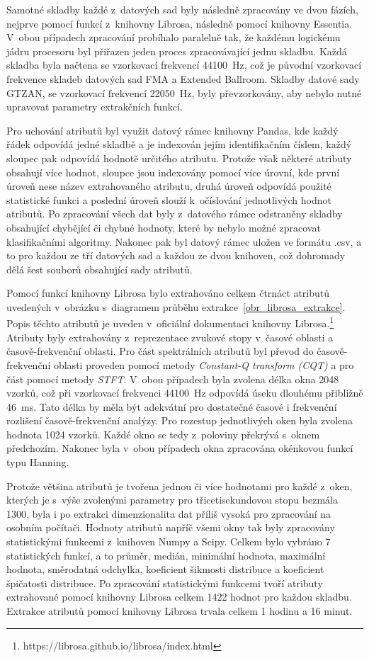 Samotné skladby každé z~datových sad byly následně zpracovány ve dvou fázích, nejprve pomocí funkcí z~knihovny Librosa, následně pomocí knihovny Essentia. V~obou případech zpracování probíhalo paralelně tak, že každému logickému jádru procesoru byl přiřazen jeden proces zpracovávající jednu skladbu. Každá skladba byla načtena se vzorkovací frekvencí 44100~Hz, což je původní vzorkovací frekvence skladeb datových sad FMA a Extended Ballroom. Skladby datové sady GTZAN, se vzorkovací frekvencí 22050~Hz, byly převzorkovány, aby nebylo nutné upravovat parametry extrakčních funkcí.

Pro uchování atributů byl využit datový rámec knihovny Pandas, kde každý řádek odpovídá jedné skladbě a je indexován jejím identifikačním číslem, každý sloupec pak odpovídá hodnotě určitého atributu. Protože však některé atributy obsahují více hodnot, sloupce jsou indexovány pomocí více úrovní, kde první úroveň nese název extrahovaného atributu, druhá úroveň odpovídá použité statistické funkci a poslední úroveň slouží k~očíslování jednotlivých hodnot atributů. Po zpracování všech dat byly z~datového rámce odstraněny skladby obsahující chybějící či chybné hodnoty, které by nebylo možné zpracovat klasifikačními algoritmy. Nakonec pak byl datový rámec uložen ve formátu .csv, a to pro každou ze tří datových sad a každou ze dvou knihoven, což dohromady dělá šest souborů obsahující sady atributů.

Pomocí funkcí knihovny Librosa bylo extrahováno celkem čtrnáct atributů uvedených v~obrázku s~diagramem průběhu extrakce~\ref{obr_librosa_extrakce}. Popis těchto atributů je uveden v~oficiální dokumentaci knihovny Librosa.\footnote{https://librosa.github.io/librosa/index.html} Atributy byly extrahovány z~reprezentace zvukové stopy v~časové oblasti a časově-frekvenční oblasti. Pro část spektrálních atributů byl převod do časově-frekvenční oblasti proveden pomocí metody \textit{Constant-Q transform (CQT)} a pro část pomocí metody \textit{STFT}. V~obou případech byla zvolena délka okna 2048 vzorků, což při vzorkovací frekvenci 44100~Hz odpovídá úseku dlouhému přibližně 46~ms. Tato délka by měla být adekvátní pro dostatečné časové i frekvenční rozlišení časově-frekvenční analýzy. Pro rozestup jednotlivých oken byla zvolena hodnota 1024 vzorků. Každé okno se tedy z~poloviny překrývá s~oknem předchozím. Nakonec byla v~obou případech okna zpracována okénkovou funkcí typu Hanning.

Protože většina atributů je tvořena jednou či více hodnotami pro každé z~oken, kterých je s~výše zvolenými parametry pro třicetisekundovou stopu bezmála 1300, byla i po extrakci dimenzionalita dat příliš vysoká pro zpracování na osobním počítači. Hodnoty atributů napříč všemi okny tak byly zpracovány statistickými funkcemi z~knihoven Numpy a Scipy. Celkem bylo vybráno 7 statistických funkcí, a to průměr, medián, minimální hodnota, maximální hodnota, směrodatná odchylka, koeficient šikmosti distribuce a koeficient špičatosti distribuce. Po zpracování statistickými funkcemi tvoří atributy extrahované pomocí knihovny Librosa celkem 1422 hodnot pro každou skladbu. Extrakce atributů pomocí knihovny Librosa trvala celkem 1 hodinu a 16 minut.

